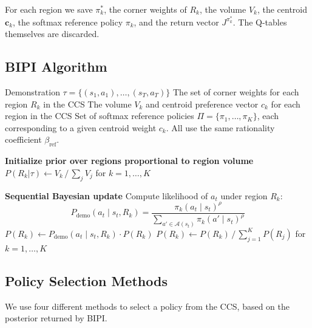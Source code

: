\documentclass[11pt]{article}
\begin{document}
For each region we save $\pi^*_k$, the corner weights of $R_k$, the volume $V_k$, the centroid $\mathbf{c}_k$, the softmax reference policy $\pi_k$, and the return vector $J^{\pi^*_k}$. The Q-tables themselves are discarded.

\subsection{BIPI Algorithm}

\begin{algorithm}[H]
\caption{Bayesian Inverse Preference Inference}
\label{alg:bmopid}
\begin{algorithmic}[1]
\Require Demonstration $\tau = \{(s_1, a_1), \ldots, (s_T, a_T)\}$
\Require The set of corner weights for each region $R_k$ in the CCS %
\Require The volume $V_k$ and centroid preference vector $c_k$ for each region in the CCS
\Require Set of softmax reference policies $\Pi = \{\pi_1, \ldots, \pi_K\}$, each corresponding to a given centroid weight $c_k$. All use the same rationality coefficient $\beta_{\text{ref}}$.

\Statex
\Statex \textbf{Initialize prior over regions proportional to region volume}
\State $P(R_k|\tau) \gets V_k \,/\, \sum_{j} V_j$ \quad for $k = 1, \ldots, K$

\Statex
\Statex \textbf{Sequential Bayesian update}
        \State Compute likelihood of $a_t$ under region $R_k$:
        \begin{equation*}
            P_{\text{demo}}(a_t \mid s_t, R_k) = \frac{\pi_k(a_t \mid s_t)^{\rho}}{\sum_{a' \in \mathcal{A}(s_t)} \pi_k(a' \mid s_t)^{\rho}}
        \end{equation*}
        \State $P(R_k) \gets P_{\text{demo}}(a_t \mid s_t, R_k) \cdot P(R_k)$
    \EndFor
    \State $P(R_k) \gets P(R_k) \,/\, \sum_{j=1}^{K} P(R_j)$ \quad for $k = 1, \ldots, K$
\EndFor

\end{algorithmic}
\end{algorithm}

\subsection{Policy Selection Methods}
We use four different methods to select a policy from the CCS, based on the posterior returned by BIPI.
\end{document}

